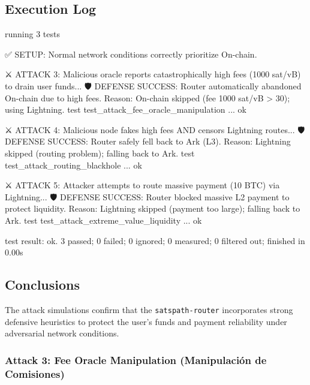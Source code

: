 \documentclass[
]{article}
\newenvironment{Shaded}{}{}
\newcommand{\NormalTok}[1]{#1}
\begin{document}
\hypertarget{execution-log-1}{%
\subsection{Execution Log}\label{execution-log-1}}

\begin{Shaded}
\begin{Highlighting}[]
\NormalTok{running 3 tests}

\NormalTok{✅ SETUP: Normal network conditions correctly prioritize On{-}chain.}

\NormalTok{⚔️ ATTACK 3: Malicious oracle reports catastrophically high fees (1000 sat/vB) to drain user funds...}
\NormalTok{🛡️ DEFENSE SUCCESS: Router automatically abandoned On{-}chain due to high fees. Reason: On{-}chain skipped (fee 1000 sat/vB \textgreater{} 30); using Lightning.}
\NormalTok{test test\_attack\_fee\_oracle\_manipulation ... ok}

\NormalTok{⚔️ ATTACK 4: Malicious node fakes high fees AND censors Lightning routes...}
\NormalTok{🛡️ DEFENSE SUCCESS: Router safely fell back to Ark (L3). Reason: Lightning skipped (routing problem); falling back to Ark.}
\NormalTok{test test\_attack\_routing\_blackhole ... ok}

\NormalTok{⚔️ ATTACK 5: Attacker attempts to route massive payment (10 BTC) via Lightning...}
\NormalTok{🛡️ DEFENSE SUCCESS: Router blocked massive L2 payment to protect liquidity. Reason: Lightning skipped (payment too large); falling back to Ark.}
\NormalTok{test test\_attack\_extreme\_value\_liquidity ... ok}

\NormalTok{test result: ok. 3 passed; 0 failed; 0 ignored; 0 measured; 0 filtered out; finished in 0.00s}
\end{Highlighting}
\end{Shaded}

\hypertarget{conclusions-1}{%
\subsection{Conclusions}\label{conclusions-1}}

The attack simulations confirm that the \texttt{satspath-router}
incorporates strong defensive heuristics to protect the user's funds and
payment reliability under adversarial network conditions.

\hypertarget{attack-3-fee-oracle-manipulation-manipulaciuxf3n-de-comisiones}{%
\subsubsection{Attack 3: Fee Oracle Manipulation (Manipulación de
Comisiones)}\label{attack-3-fee-oracle-manipulation-manipulaciuxf3n-de-comisiones}}
\end{document}

